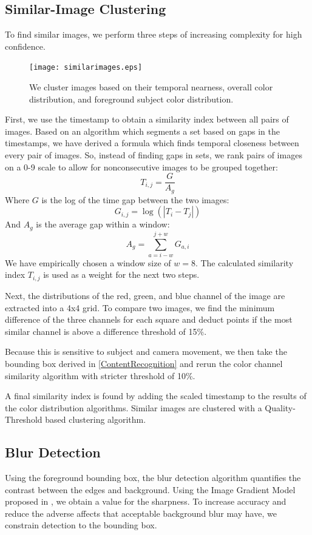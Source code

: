 \documentclass{article}
\begin{document}
\subsection{Similar-Image Clustering}
To find similar images, we perform three steps of increasing complexity for high confidence.
\begin{figure}[t]
  \centering
    \texttt{[image: similarimages.eps]}
  \caption{We cluster images based on their temporal nearness, overall color distribution, and foreground subject color distribution.}
\end{figure}
First, we use the timestamp to obtain a similarity index between all pairs of images. Based on an algorithm which segments a set based on gaps in the timestamps\cite{1292402}, we have derived a formula which finds temporal closeness between every pair of images. So, instead of finding gaps in sets, we rank pairs of images on a 0-9 scale to allow for nonconsecutive images to be grouped together:
\[
T_{i,j}=\frac{G}{A_g}
\]
Where \(G\) is the log of the time gap between the two images:
\[
G_{i,j}=\log(|T_i-T_j|)
\]
And \(A_g\) is the average gap within a window:
\[
A_g=\displaystyle\sum\limits_{a={i-w}}^{j+w}G_{a,i}
\]
We have empirically chosen a window size of \(w=8\).
The calculated similarity index \(T_{i,j}\) is used as a weight for the next two steps.

Next, the distributions of the red, green, and blue channel of the image are extracted into a 4x4 grid. To compare two images, we find the minimum difference of the three channels for each square and deduct points if the most similar channel is above a difference threshold of 15\%.

Because this is sensitive to subject and camera movement, we then take the bounding box derived in \ref{ContentRecognition} and rerun the color channel similarity algorithm with stricter threshold of 10\%.

A final similarity index is found by adding the scaled timestamp to the results of the color distribution algorithms. Similar images are clustered with a Quality-Threshold based clustering algorithm.

\subsection{Blur Detection}
Using the foreground bounding box, the blur detection algorithm quantifies the contrast between the edges and background. Using the Image Gradient Model proposed in \cite{springerlink:10.1007/978-3-540-77409-9_26}, we obtain a value for the sharpness. To increase accuracy and reduce the adverse affects that acceptable background blur may have, we constrain detection to the bounding box.
\end{document}
